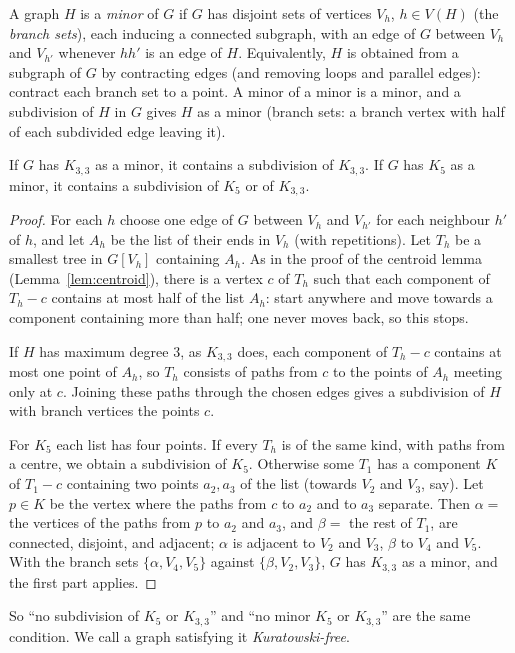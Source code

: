 A graph $H$ is a \emph{minor} of $G$ if $G$ has disjoint sets of vertices $V_h$, $h\in V(H)$ (the \emph{branch sets}), each inducing a connected subgraph, with an
edge of $G$ between $V_h$ and $V_{h'}$ whenever $hh'$ is an edge of $H$. Equivalently, $H$ is obtained from a subgraph of $G$ by contracting edges
(and removing loops and parallel edges): contract each branch set to a point. A minor of a minor is a minor, and a subdivision of $H$ in
$G$ gives $H$ as a minor (branch sets: a branch vertex with half of each subdivided edge leaving it).

\begin{lemma}\label{lem:minorsub}
If $G$ has $K_{3,3}$ as a minor, it contains a subdivision of $K_{3,3}$. If $G$ has $K_5$ as a minor, it contains a subdivision of $K_5$ or of $K_{3,3}$.
\end{lemma}
\begin{proof}
For each $h$ choose one edge of $G$ between $V_h$ and $V_{h'}$ for each neighbour $h'$ of $h$, and let $A_h$ be the list of their ends in $V_h$ (with repetitions).
Let $T_h$ be a smallest tree in $G[V_h]$ containing $A_h$. As in the proof of the centroid lemma (Lemma~\ref{lem:centroid}), there is a vertex $c$ of $T_h$ such that each
component of $T_h-c$ contains at most half of the list $A_h$: start anywhere and move towards a component containing more than half; one never moves
back, so this stops.

If $H$ has maximum degree $3$, as $K_{3,3}$ does, each component of $T_h-c$ contains at most one point of $A_h$, so $T_h$ consists of paths from $c$ to the points of
$A_h$ meeting only at $c$. Joining these paths through the chosen edges gives a subdivision of $H$ with branch vertices the points $c$.

For $K_5$ each list has four points. If every $T_h$ is of the same kind, with paths from a centre, we obtain a subdivision of $K_5$. Otherwise some $T_1$ has a
component $K$ of $T_1-c$ containing two points $a_2,a_3$ of the list (towards $V_2$ and $V_3$, say). Let $p\in K$ be the vertex where the paths from $c$ to $a_2$
and to $a_3$ separate. Then $\alpha=$ the vertices of the paths from $p$ to $a_2$ and $a_3$, and $\beta=$ the rest of $T_1$, are connected, disjoint, and adjacent; $\alpha$ is
adjacent to $V_2$ and $V_3$, $\beta$ to $V_4$ and $V_5$. With the branch sets $\{\alpha,V_4,V_5\}$ against $\{\beta,V_2,V_3\}$, $G$ has $K_{3,3}$ as a minor, and the first part
applies.
\end{proof}

So ``no subdivision of $K_5$ or $K_{3,3}$'' and ``no minor $K_5$ or $K_{3,3}$'' are the same condition. We call a graph satisfying it \emph{Kuratowski-free}.

